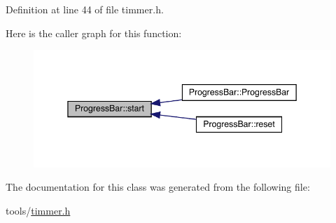 Definition at line 44 of file timmer.\+h.

Here is the caller graph for this function\+:\nopagebreak
\begin{figure}[H]
\begin{center}
\leavevmode
\includegraphics[width=345pt]{class_progress_bar_a25637ac030839b0ea50cfbb91b129359_icgraph}
\end{center}
\end{figure}


The documentation for this class was generated from the following file\+:\begin{DoxyCompactItemize}
\item 
tools/\mbox{\hyperlink{timmer_8h}{timmer.\+h}}\end{DoxyCompactItemize}
